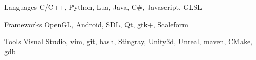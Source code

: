 


\begin{cvskills}


\cvskill
{Languages} %
{C/C++, Python, Lua, Java, C\#, Javascript, GLSL } %

\cvskill
{Frameworks}
{OpenGL, Android, SDL, Qt, gtk+, Scaleform}

\cvskill
{Tools}
{Visual Studio, vim, git, bash, Stingray, Unity3d, Unreal, maven, CMake, gdb}



\end{cvskills}
